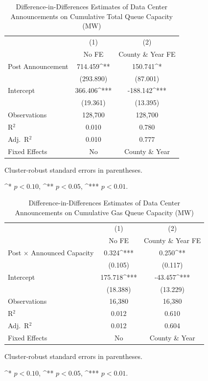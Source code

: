 \documentclass[sigconf]{acmart}
\newcommand{\sym}[1]{^{#1}}
\begin{document}
\begin{table}[htbp]\centering
\caption{Difference-in-Differences Estimates of Data Center Announcements on Cumulative Total Queue Capacity (MW)}
\begin{threeparttable}
\begin{tabular}{lcc}
\toprule
& (1) & (2) \\
& No FE & County \& Year FE \\
\midrule
Post Announcement & 714.459\sym{**} & 150.741\sym{*} \\
& (293.890) & (87.001) \\
Intercept & 366.406\sym{***} & -188.142\sym{***} \\
& (19.361) & (13.395) \\
\midrule
Observations & 128,700 & 128,700 \\
R$^2$ & 0.010 & 0.780 \\
Adj.\ R$^2$ & 0.010 & 0.777 \\
Fixed Effects & No & County \& Year \\
\bottomrule
\end{tabular}
\begin{tablenotes}[flushleft]
\footnotesize
\item Cluster-robust standard errors in parentheses. 
\item \sym{*} $p<0.10$, \sym{**} $p<0.05$, \sym{***} $p<0.01$. 
\end{tablenotes}
\end{threeparttable}
\label{DIDTotal}
\end{table}

\begin{table}[htbp]\centering
\caption{Difference-in-Differences Estimates of Data Center Announcements on Cumulative Gas Queue Capacity (MW)}
\begin{threeparttable}
\begin{tabular}{lcc}
\toprule
& (1) & (2) \\
& No FE & County \& Year FE \\
\midrule
Post $\times$ Announced Capacity & 0.324\sym{***} & 0.250\sym{**} \\
& (0.105) & (0.117) \\
Intercept & 175.718\sym{***} & -43.457\sym{***} \\
& (18.388) & (13.229) \\
\midrule
Observations & 16,380 & 16,380 \\
R$^2$ & 0.012 & 0.610 \\
Adj.\ R$^2$ & 0.012 & 0.604 \\
Fixed Effects & No & County \& Year \\
\bottomrule
\end{tabular}
\begin{tablenotes}[flushleft]
\footnotesize
\item Cluster-robust standard errors in parentheses. 
\item \sym{*} $p<0.10$, \sym{**} $p<0.05$, \sym{***} $p<0.01$. 
\end{tablenotes}
\end{threeparttable}
\label{DIDGas}
\end{table}
\end{document}
